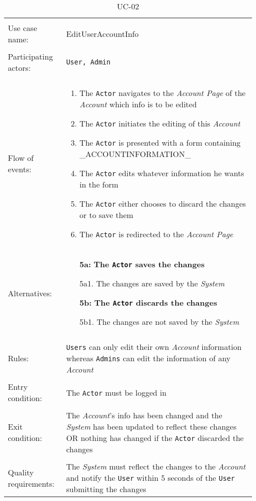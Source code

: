 \noindent
\begin{table}[h!]
\caption{UC-02}
\label{UC-02}
\begin{tabular}{ l  p{8cm} } 
\hline 
\\
Use case name:  & EditUserAccountInfo   \\   \hline    
\\            
Participating actors:  & \texttt{User, \texttt{Admin}} \\   \hline   
\\      
Flow of events: & \begin{enumerate}
\item{The \texttt{Actor} navigates to the \textit{Account Page} of the \textit{Account} which info is to be edited}
\item{The \texttt{Actor} initiates the editing of this \textit{Account}}
\item{The \texttt{Actor} is presented with a form containing \_ACCOUNTINFORMATION\_}
\item{The \texttt{Actor} edits whatever information he wants in the form}
\item{The \texttt{Actor} either chooses to discard the changes or to save them}
\item{The \texttt{Actor} is redirected to the \textit{Account Page}}
\end{enumerate}
\\
Alternatives: & \begin{itemize}
\item[\textbf{5a:}]{\textbf{The \texttt{Actor} saves the changes}}
\item[]  5a1. The changes are saved by the \textit{System}
\item[\textbf{5b:}]\textbf{The \texttt{Actor} discards the changes}
\item[]  5b1. The changes are not saved by the \textit{System}
\end{itemize}
\\ \hline
\\
Rules: & \texttt{Users} can only edit their own \textit{Account} information whereas \texttt{Admins} can edit the information of any  \textit{Account}
\\   \hline 
\\
Entry condition: & The \texttt{Actor} must be logged in \\ \hline
\\
Exit condition: & The \textit{Account}'s info has been changed and the \textit{System} has been updated to reflect these changes OR
nothing has changed if the \texttt{Actor} discarded the changes\\ \hline
\\
Quality requirements: & The \textit{System} must reflect the changes to the \textit{Account} and notify the \texttt{User} within 5 seconds of the \texttt{User} submitting the changes \\ \hline  
\end{tabular}
\end{table}

